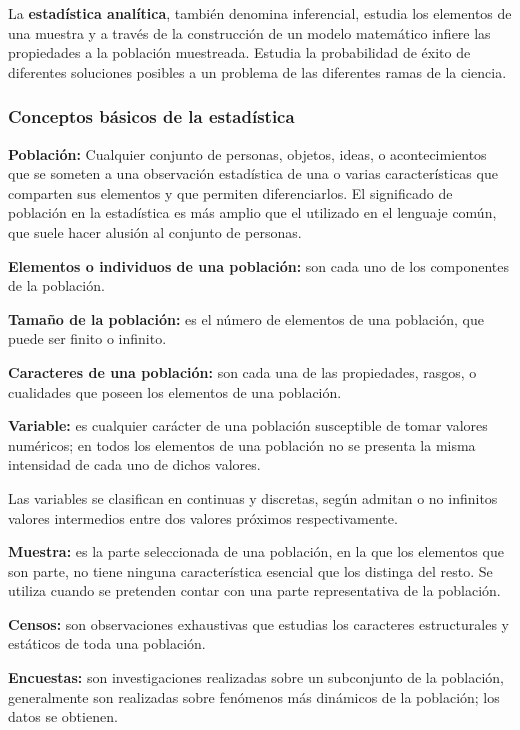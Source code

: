 \documentclass[a5paper,doc,10pt,noapacite]{apa6}
\begin{document}
{{La \textbf{estadística analítica}, también denomina inferencial, estudia los elementos de una muestra y a través de la construcción de un modelo matemático infiere las propiedades a la población muestreada. Estudia la probabilidad de éxito de diferentes soluciones posibles a un problema de las diferentes ramas de la ciencia.

\subsubsection{Conceptos básicos de la estadística}

\textbf{Población:} Cualquier conjunto de personas, objetos, ideas, o acontecimientos que se someten a una observación estadística de una o varias características que comparten sus elementos y que permiten diferenciarlos. El significado de población en la estadística es más amplio que el utilizado en el lenguaje común, que suele hacer alusión al conjunto de personas.

\textbf{Elementos o individuos de una población:} son cada uno de los componentes de la población.

\textbf{Tamaño de la población:} es el número de elementos de una población, que puede ser finito o infinito.

\textbf{Caracteres de una población:} son cada una de las propiedades, rasgos, o cualidades que poseen los elementos de una población.

\textbf{Variable:} es cualquier carácter de una población susceptible de tomar valores numéricos; en todos los elementos de una población no se presenta la misma intensidad de cada uno de dichos valores.

Las variables se clasifican en continuas y discretas, según admitan o no infinitos valores intermedios entre dos valores próximos respectivamente.

\textbf{Muestra:} es la parte seleccionada de una población, en la que los elementos que son parte, no tiene ninguna característica esencial que los distinga del resto. Se utiliza cuando se pretenden contar con una parte representativa de la población.

\textbf{Censos:} son observaciones exhaustivas que estudias los caracteres estructurales y estáticos de toda una población.

\textbf{Encuestas:} son investigaciones realizadas sobre un subconjunto de la población, generalmente son realizadas sobre fenómenos más dinámicos de la población; los datos se obtienen. 

}}
\end{document}
